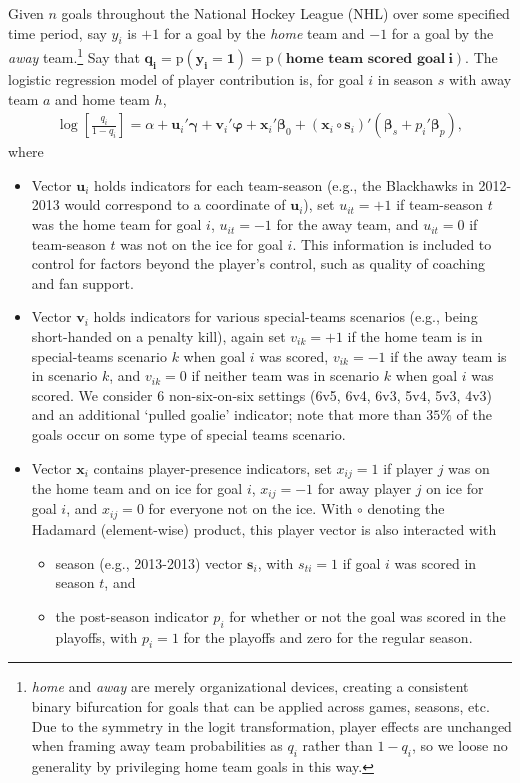 Given $n$ goals throughout the National Hockey League (NHL) over some
specified time period,  say $y_i$ is $+1$ for a goal by the \textit{home} team
and $-1$ for a goal by the \textit{away} team.\footnote{{\em home} and {\em
away} are merely organizational devices, creating a consistent binary
bifurcation for goals that can be applied across games, seasons, etc. Due to
the symmetry in the logit transformation, player effects are unchanged when
framing away team probabilities as $q_i$ rather than $1-q_i$, so we loose no
generality by privileging home team goals in this way.}  Say that $\boldsymbol{q_i =
\mathrm{p}(y_i = 1) =  \mathrm{p}(\textbf{home~team~scored~goal}~i)}$.  The
logistic regression model of player contribution is, for goal $i$ in season
$s$ with away team $a$ and home team $h$,  \begin{align}\label{hockeymod}
\log\left[\frac{q_{i}}{1-q_{i}}\right] = \alpha + \mathbf{u}_i'\boldsymbol{\gamma} +
\mathbf{v}_i'\boldsymbol{\varphi} + \mathbf{x}_i'\boldsymbol{\beta}_0 +
(\mathbf{x}_i\circ\mathbf{s}_i)'(\boldsymbol{\beta}_s + p_i'\boldsymbol{\beta}_{p}), \end{align}  
where
\begin{itemize}
\item Vector $\mathbf{u}_i$ holds indicators for each team-season (e.g., the Blackhawks in 2012-2013 would correspond to a coordinate of $\mathbf{u}_i$), set 
$u_{it}=+1$ if team-season $t$ was the home team for goal $i$, $u_{it}=-1$ for the away team, and $u_{it}=0$ if team-season $t$ was not on the ice for goal $i$.  This information is included to control for factors beyond the player's control, such as quality of coaching and fan support.
\item Vector $\mathbf{v}_i$ holds indicators for various special-teams scenarios (e.g., being short-handed on a penalty kill), again set $v_{ik}=+1$ if the home team is in special-teams scenario $k$ when goal $i$ was scored, $v_{ik}=-1$ if the away team is in scenario $k$, and $v_{ik}=0$ if neither team was in scenario $k$ when goal $i$ was scored.  We consider $6$ non-six-on-six settings (6v5, 6v4, 6v3, 5v4, 5v3, 4v3) and an additional `pulled goalie' indicator; note that more than $35\%$ of the goals occur on some type of special teams scenario. 
\item Vector
$\mathbf{x}_i$ contains player-presence indicators, set $x_{ij}=1$ if player $j$ was on the
home team and on ice for goal $i$, $x_{ij}=-1$ for away player $j$ on ice for
goal $i$, and $x_{ij}=0$ for everyone not on the ice. With $\circ$ denoting the Hadamard (element-wise) product, this player vector is also interacted with 
\begin{itemize}
\item  season (e.g., 2013-2013) vector $\mathbf{s}_i$, with $s_{ti} = 1$ if goal $i$ was scored in season $t$, and
\item the post-season indicator $p_i$  for whether or not the goal was scored in the playoffs, with $p_{i} =1$ for the playoffs and zero for the regular season.
\end{itemize}  
\end{itemize}
